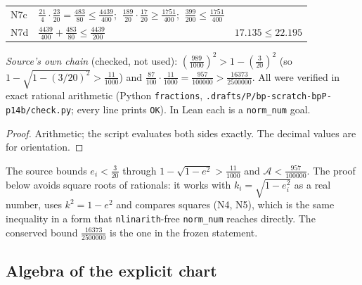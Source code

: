 \begin{lemma}
\begin{center}
\begin{tabular}{lll}
N7c & $\frac{21}{4}\cdot\frac{23}{20}=\frac{483}{80}\le\frac{4439}{400}$; $\ \frac{189}{20}\cdot\frac{17}{20}\ge\frac{1751}{400}$; $\ \frac{399}{200}\le\frac{1751}{400}$ & \\
N7d & $\frac{4439}{400}+\frac{483}{80}\le\frac{4439}{200}$ & $17.135\le22.195$\\
\hline
\end{tabular}
\end{center}
\emph{Source's own chain} (checked, not used): $(\frac{989}{1000})^2>1-(\frac3{20})^2$ (so $1-\sqrt{1-(3/20)^2}>\frac{11}{1000}$) and $\frac{87}{100}\cdot\frac{11}{1000}=\frac{957}{100000}>\frac{16373}{2500000}$.
All were verified in exact rational arithmetic (Python \texttt{fractions}, \texttt{.drafts/P/bp-scratch-bpP-p14b/check.py}; every line prints \texttt{OK}). In Lean each is a \texttt{norm\_num} goal.
\end{lemma}
\begin{proof}
Arithmetic; the script evaluates both sides exactly. The decimal values are for orientation. \qedhere
\end{proof}

\begin{remark}\label{bpP:p14:sb-route}
The source bounds $e_i<\frac3{20}$ through $1-\sqrt{1-e^2}>\frac{11}{1000}$ and $\mathcal A<\frac{957}{100000}$. The proof below avoids square roots of rationals: it works with $k_i=\sqrt{1-e_i^2}$ as a real number, uses $k^2=1-e^2$ and compares squares (N4, N5), which is the same inequality in a form that \texttt{nlinarith}-free \texttt{norm\_num} reaches directly. The conserved bound $\frac{16373}{2500000}$ is the one in the frozen statement.
\end{remark}

\subsection{Algebra of the explicit chart}\label{bpP:p14:sb-alg}

